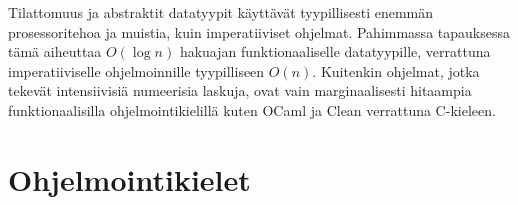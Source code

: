 Tilattomuus ja abstraktit datatyypit käyttävät tyypillisesti enemmän prosessoritehoa ja muistia, kuin imperatiiviset
ohjelmat. Pahimmassa tapauksessa tämä aiheuttaa $ O(\log{}n) $ hakuajan funktionaaliselle datatyypille, verrattuna 
imperatiiviselle ohjelmoinnille tyypilliseen $ O(n) $. Kuitenkin ohjelmat, jotka tekevät intensiivisiä numeerisia 
laskuja, ovat vain marginaalisesti hitaampia funktionaalisilla ohjelmointikielillä kuten OCaml ja Clean verrattuna 
C-kieleen.\cite{benchmark}

\section{Ohjelmointikielet}

